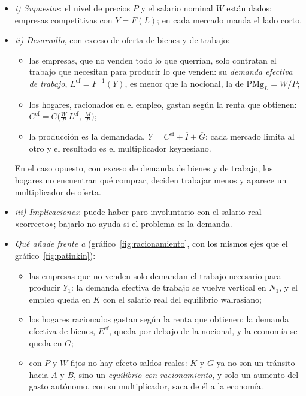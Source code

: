 \documentclass[11pt]{article}
\begin{document}
\begin{itemize}
\item \emph{i) Supuestos}: el nivel de precios $P$ y el salario nominal $W$ están dados; empresas competitivas con $Y=F(L)$; en cada mercado manda el lado corto.
\item \emph{ii) Desarrollo}, con exceso de oferta de bienes y de trabajo:
  \begin{itemize}
  \item las empresas, que no venden todo lo que querrían, solo contratan el trabajo que necesitan para producir lo que venden: su \emph{demanda efectiva de trabajo}, $L^{\mathrm{ef}}=F^{-1}(Y)$, es menor que la nocional, la de $\mathrm{PMg}_L=W/P$;
  \item los hogares, racionados en el empleo, gastan según la renta que obtienen: $C^{\mathrm{ef}}=C\big(\tfrac{W}{P}\,L^{\mathrm{ef}},\,\tfrac{M}{P}\big)$;
  \item la producción es la demandada, $Y=C^{\mathrm{ef}}+\overline{I}+\overline{G}$: cada mercado limita al otro y el resultado es el multiplicador keynesiano.
  \end{itemize}
  En el caso opuesto, con exceso de demanda de bienes y de trabajo, los hogares no encuentran qué comprar, deciden trabajar menos y aparece un multiplicador de oferta.
\item \emph{iii) Implicaciones}: puede haber paro involuntario con el salario real «correcto»; bajarlo no ayuda si el problema es la demanda.
\item \emph{Qué añade frente a } (gráfico~\ref{fig:racionamiento}, con los mismos ejes que el gráfico~\ref{fig:patinkin}):
  \begin{itemize}
  \item las empresas que no venden solo demandan el trabajo necesario para producir $Y_1$: la demanda efectiva de trabajo se vuelve vertical en $N_1$, y el empleo queda en $K$ con el salario real del equilibrio walrasiano;
  \item los hogares racionados gastan según la renta que obtienen: la demanda efectiva de bienes, $E^{\mathrm{ef}}$, queda por debajo de la nocional, y la economía se queda en $G$;
  \item con $P$ y $W$ fijos no hay efecto saldos reales: $K$ y $G$ ya no son un tránsito hacia $A$ y $B$, sino un \emph{equilibrio con racionamiento}, y solo un aumento del gasto autónomo, con su multiplicador, saca de él a la economía.
  \end{itemize}
\end{itemize}
\end{document}
